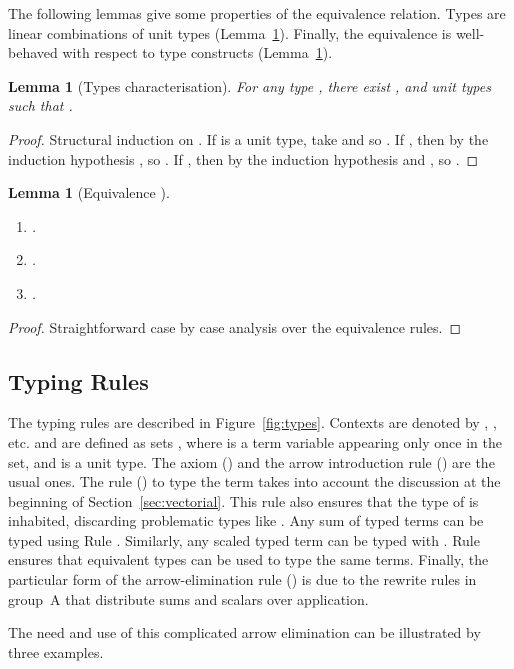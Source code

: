 \documentclass[colorlinks=true,linkcolor=black,urlcolor=black,citecolor=blue,submission,copyright,creativecommons]{eptcs}
\newtheorem{lemma}[theorem]{Lemma}
\begin{document}
The following lemmas give some properties of the equivalence
relation. Types are linear combinations of unit types
(Lemma~\ref{lem:typecharact}). Finally, the equivalence is well-behaved with respect to
type constructs (Lemma~\ref{lem:equivforall}).

\begin{lemma}[Types characterisation]\label{lem:typecharact}
 For any type , there exist ,  and unit types  such that .
\end{lemma}
\begin{proof}
 Structural induction on . If  is a unit type, take  and so . If , then by the induction hypothesis , so . If , then by the induction hypothesis  and , so .
\end{proof}


\begin{lemma}[Equivalence ]\label{lem:equivforall}~
\begin{enumerate}
 \item\label{it:equivforall1} 
.
 \item\label{it:equivforall2} .
 \item\label{it:equivforall3} .
\end{enumerate}
\end{lemma}
\begin{proof}
 Straightforward case by case analysis over the equivalence rules.
\end{proof}


\subsection{Typing Rules}

The typing rules are described in Figure~\ref{fig:types}. 
Contexts are denoted by , , etc. and are defined as sets , where  is a term variable appearing only once in the set, and  is a unit type.
The axiom
() and the arrow introduction rule () are the usual
ones. The rule () to type the term  takes into account
the discussion at the beginning of Section~\ref{sec:vectorial}. This rule
also ensures that the type of  is inhabited, discarding
problematic types like . Any sum of typed terms can be
typed using Rule . Similarly, any scaled typed term can be typed
with . Rule  ensures that equivalent types can
be used to type the same terms. Finally, the particular form of the
arrow-elimination rule () is due to the rewrite rules in
group~A that distribute sums and scalars over application. 

The need and use of this complicated arrow elimination can be
illustrated by three examples.
\end{document}
